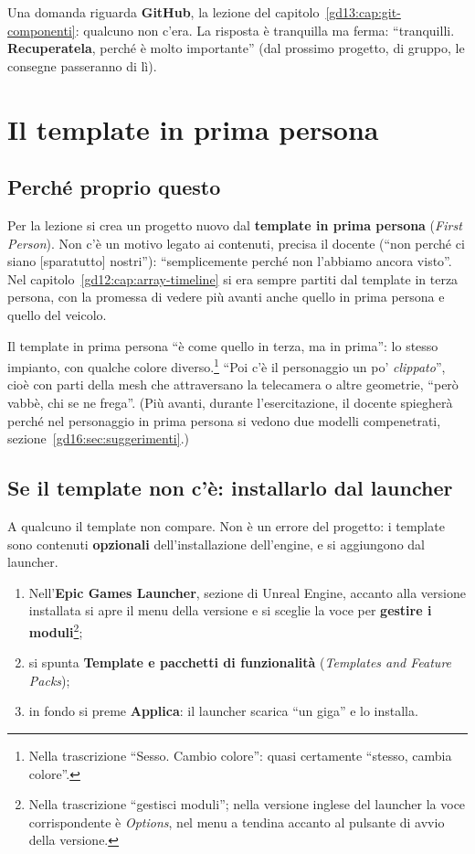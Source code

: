 Una domanda riguarda \textbf{GitHub}, la lezione del
capitolo~\ref{gd13:cap:git-componenti}: qualcuno non c'era. La risposta è
tranquilla ma ferma: ``tranquilli. \textbf{Recuperatela}, perché è molto
importante'' (dal prossimo progetto, di gruppo, le consegne passeranno di
lì).

\section{Il template in prima persona}
\label{gd16:sec:template}

\subsection{Perché proprio questo}

Per la lezione si crea un progetto nuovo dal \textbf{template in prima
persona} (\emph{First Person}). Non c'è un motivo legato ai contenuti, precisa il
docente (``non perché ci siano [sparatutto] nostri''): ``semplicemente perché
non l'abbiamo ancora visto''. Nel capitolo~\ref{gd12:cap:array-timeline} si
era sempre partiti dal template in terza persona, con la promessa di vedere più
avanti anche quello in prima persona e quello del veicolo.

Il template in prima persona ``è come quello in terza, ma in prima'': lo
stesso impianto, con qualche colore diverso.\footnote{Nella trascrizione
``Sesso. Cambio colore'': quasi certamente ``stesso, cambia colore''.} ``Poi c'è
il personaggio un po' \emph{clippato}'', cioè con parti della mesh che
attraversano la telecamera o altre geometrie, ``però vabbè, chi se ne
frega''. (Più avanti, durante l'esercitazione, il docente spiegherà
perché nel personaggio in prima persona si vedono due modelli compenetrati,
sezione~\ref{gd16:sec:suggerimenti}.)

\subsection{Se il template non c'è: installarlo dal launcher}

A qualcuno il template non compare. Non è un errore del progetto: i template
sono contenuti \textbf{opzionali} dell'installazione dell'engine, e si
aggiungono dal launcher.
\begin{enumerate}
  \item Nell'\textbf{Epic Games Launcher}, sezione di Unreal Engine, accanto
        alla versione installata si apre il menu della versione e si sceglie
        la voce per \textbf{gestire i moduli}\footnote{Nella trascrizione
        ``gestisci moduli''; nella versione inglese del launcher la voce
        corrispondente è \emph{Options}, nel menu a tendina accanto al pulsante
        di avvio della versione.};
  \item si spunta \textbf{Template e pacchetti di funzionalità}
        (\emph{Templates and Feature Packs});
  \item in fondo si preme \textbf{Applica}: il launcher scarica ``un giga'' e
        lo installa.
\end{enumerate}

